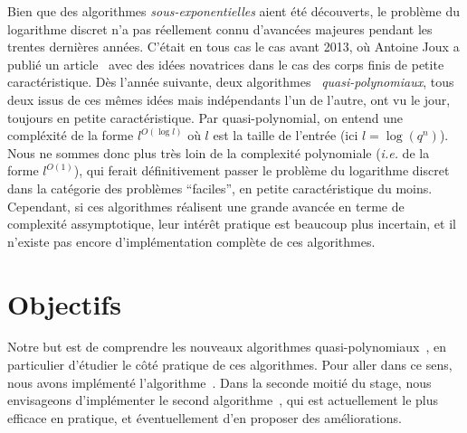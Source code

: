 \documentclass[a4paper,11pt]{article}
\theoremstyle{break}
\theoremstyle{sc}
\theoremstyle{definition}
\theoremstyle{remark}
\newcommand{\ie}{\emph{i.e. }}
\begin{document}
Bien que des algorithmes \emph{sous-exponentielles} aient été
découverts, le problème du logarithme discret n'a pas réellement connu
d'avancées majeures pendant les trentes dernières années. C'était en tous cas
le cas avant 2013, où Antoine Joux a publié un article~\cite{Joux13} avec des
idées novatrices dans le cas des corps finis de petite
caractéristique. Dès l'année suivante, deux
algorithmes~\cite{BGJT13, GKZ14} \emph{quasi-polynomiaux}, tous deux issus de ces
mêmes idées mais indépendants l'un de
l'autre, ont vu le jour, toujours en petite caractéristique. Par quasi-polynomial, on entend une compléxité
de la forme $l^{O(\log l)}$ où $l$ est la taille de l'entrée (ici $l=\log
(q^n)$). Nous ne sommes donc plus très loin de la complexité
polynomiale (\ie de la forme $l^{O(1)}$), qui ferait définitivement passer 
le problème du logarithme discret dans la catégorie des problèmes
``faciles'', en petite caractéristique du moins. Cependant, si ces
algorithmes réalisent une grande avancée en terme de complexité
assymptotique, leur intérêt pratique est beaucoup plus incertain, et il n'existe
pas encore d'implémentation complète de ces algorithmes.

\section{Objectifs}

Notre but est de comprendre les nouveaux algorithmes
quasi-polynomiaux~\cite{BGJT13, GKZ14}, en particulier d'étudier le côté
pratique de ces algorithmes. Pour aller dans ce sens, nous avons implémenté
l'algorithme~\cite{BGJT13}. Dans la seconde moitié du stage, nous
envisageons d'implémenter le second algorithme~\cite{GKZ14}, qui est
actuellement le plus efficace en pratique, et éventuellement d'en proposer
des améliorations.


\end{document}
